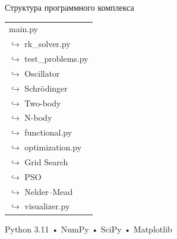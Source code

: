 \begin{frame}{Структура программного комплекса}
	
	\small
	
	\begin{tabular}{l}
		main.py \\
		\quad $\hookrightarrow$ rk\_solver.py \\
		\quad $\hookrightarrow$ test\_problems.py \\
		\qquad $\hookrightarrow$ Oscillator \\
		\qquad $\hookrightarrow$ Schrödinger \\
		\qquad $\hookrightarrow$ Two-body \\
		\qquad $\hookrightarrow$ N-body \\
		\quad $\hookrightarrow$ functional.py \\
		\quad $\hookrightarrow$ optimization.py \\
		\qquad $\hookrightarrow$ Grid Search \\
		\qquad $\hookrightarrow$ PSO \\
		\qquad $\hookrightarrow$ Nelder--Mead \\
		\quad $\hookrightarrow$ visualizer.py \\
	\end{tabular}
	
	\vspace{0.3cm}
	
	\centering
	Python 3.11 \quad • \quad NumPy \quad • \quad SciPy \quad • \quad Matplotlib
	
\end{frame}